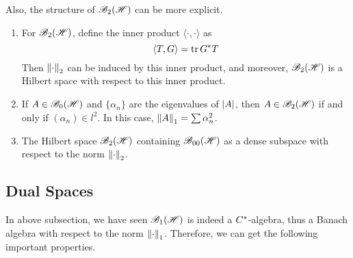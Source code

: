 \documentclass[a4paper,11pt]{report}
\begin{document}
Also, the structure of $\mathscr{B}_{2}\mathscr{(H)}$ can be more explicit.

\begin{thm}
	\begin{enumerate}[label = \arabic*)]
		\item For $\mathscr{B}_{2}\mathscr{(H)}$, define the inner product $\langle \cdot,\cdot \rangle$ as
		\begin{equation*}
			\langle T,G \rangle = \operatorname{tr}{G^{*}T}
		\end{equation*}
		Then $\left\lVert\cdot\right\lVert_2$ can be induced by this inner product, and moreover, $\mathscr{B}_{2}\mathscr{(H)}$ is a Hilbert space with respect to this inner product.
		\item If $A \in \mathscr{B}_{0}\mathscr{(H)}$ and $\{\alpha_n\}$ are the eigenvalues of $\left\lvert A\right\lvert$, then $A \in \mathscr{B}_{2}\mathscr{(H)}$ if and only if $(\alpha_n) \in l^{2}$. In this case, $\left\lVert A\right\lVert_1 = \sum \alpha_n^2$.
		\item The Hilbert space $\mathscr{B}_{2}\mathscr{(H)}$ containing $\mathscr{B}_{00}\mathscr{(H)}$ as a dense subspace with respect to the norm $\left\lVert\cdot\right\lVert_2$.
	\end{enumerate}
\end{thm}

\subsection{Dual Spaces}

In above subsection, we have seen $\mathscr{B}_{1}\mathscr{(H)}$ is indeed a $C^{*}$-algebra, thus a Banach algebra with respect to the norm $\left\lVert\cdot\right\lVert_1$. Therefore, we can get the following important properties.
\end{document}
